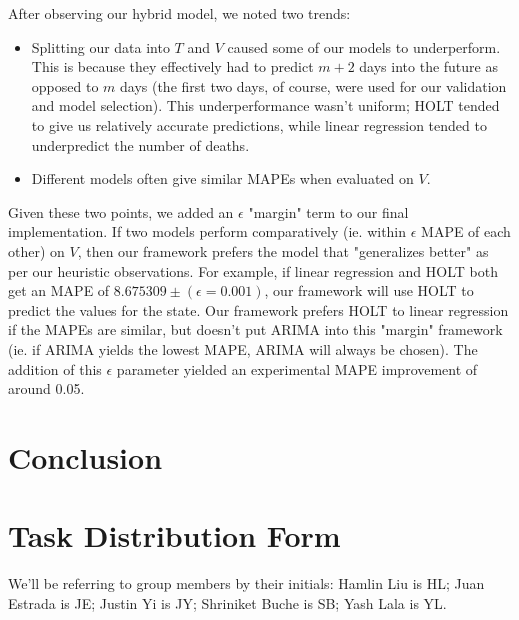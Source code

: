 \documentclass[sigconf,nonacm]{acmart}
\begin{document}
After observing our hybrid model, we noted two trends: 
\begin{itemize}
\item 
Splitting our data into $T$ and $V$ caused some of our models to
underperform. This is because they effectively had to predict $m+2$ days into
the future as opposed to $m$ days (the first two days, of course, were used for
our validation and model selection). This underperformance wasn't uniform;
HOLT tended to give us relatively accurate predictions, while linear regression
tended to underpredict the number of deaths. 
\item
Different models often give similar MAPEs when evaluated on $V$. 
\end{itemize}

Given these two points, we added an $\epsilon$ "margin" term to our final
implementation. If two models perform comparatively (ie. within $\epsilon$ MAPE
of each other) on $V$, then our framework prefers the model that "generalizes
better" as per our heuristic observations. For example, if linear regression
and HOLT both get an MAPE of $8.675309 \pm (\epsilon = 0.001)$, our framework
will use HOLT to predict the values for the state. Our framework prefers HOLT
to linear regression if the MAPEs are similar, but doesn't put ARIMA into this
"margin" framework (ie. if ARIMA yields the lowest MAPE, ARIMA will always be
chosen). The addition of this $\epsilon$ parameter yielded an experimental 
MAPE improvement of around 0.05. 

\section{Conclusion}

\section{Task Distribution Form}

We'll be referring to group members by their initials: Hamlin Liu is HL; Juan
Estrada is JE; Justin Yi is JY; Shriniket Buche is SB; Yash Lala is YL. 
\end{document}
